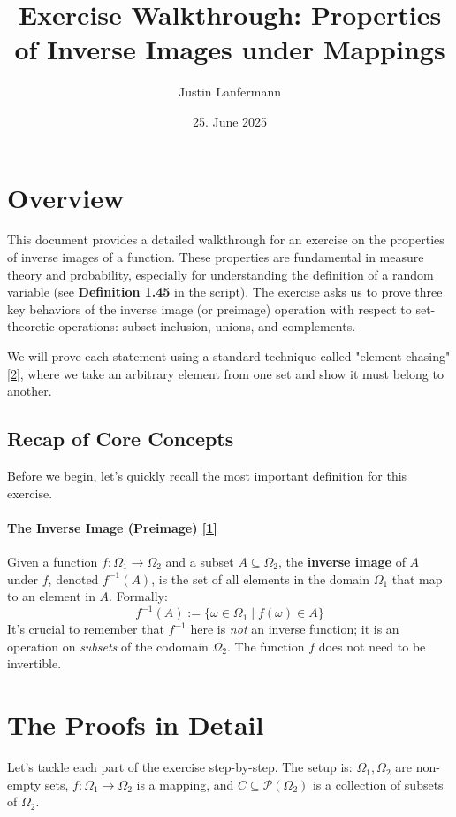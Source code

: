 \documentclass[11pt,a4paper]{article}
\title{Exercise Walkthrough: Properties of Inverse Images under Mappings}
\author{Justin Lanfermann}
\date{25. June 2025}
\newcommand{\myref}[2]{\hyperlink{#1}{\color{red!80!black}[#2]}}
\begin{document}
\maketitle

\section*{Overview}

This document provides a detailed walkthrough for an exercise on the properties of inverse images of a function. These properties are fundamental in measure theory and probability, especially for understanding the definition of a random variable (see \textbf{Definition 1.45} in the script). The exercise asks us to prove three key behaviors of the inverse image (or preimage) operation with respect to set-theoretic operations: subset inclusion, unions, and complements.

We will prove each statement using a standard technique called "element-chasing" \myref{ref:element_chasing}{2}, where we take an arbitrary element from one set and show it must belong to another.

\subsection*{Recap of Core Concepts}

Before we begin, let's quickly recall the most important definition for this exercise.

\paragraph{The Inverse Image (Preimage) \myref{ref:inverse_image}{1}}
Given a function $f: \Omega_1 \to \Omega_2$ and a subset $A \subseteq \Omega_2$, the \textbf{inverse image} of $A$ under $f$, denoted $f^{-1}(A)$, is the set of all elements in the domain $\Omega_1$ that map to an element in $A$. Formally:
\[
f^{-1}(A) := \{ \omega \in \Omega_1 \mid f(\omega) \in A \}
\]
It's crucial to remember that $f^{-1}$ here is \textit{not} an inverse function; it is an operation on \textit{subsets} of the codomain $\Omega_2$. The function $f$ does not need to be invertible.

\section{The Proofs in Detail}

Let's tackle each part of the exercise step-by-step.
The setup is: $\Omega_1, \Omega_2$ are non-empty sets, $f : \Omega_1 \to \Omega_2$ is a mapping, and $C \subseteq \mathcal{P}(\Omega_2)$ is a collection of subsets of $\Omega_2$.
\end{document}
